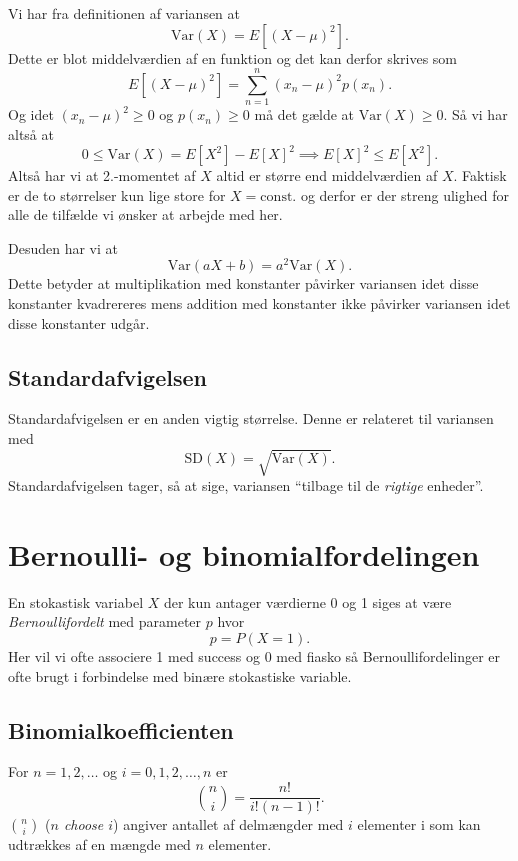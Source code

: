 Vi har fra definitionen af variansen at
\[ 
\mathrm{Var}(X) = E \left[ (X-\mu)^2 \right]
.\]
Dette er blot middelværdien af en funktion og det kan derfor skrives som
\[ 
  E \left[ (X-\mu)^2 \right] = \sum_{n = 1}^{n} (x_n - \mu)^2 p(x_n)
.\]
Og idet $(x_n - \mu)^2 \geq 0$ og $p(x_n) \geq 0$ må det gælde at $\mathrm{Var}(X) \geq 0$. Så vi har altså at
\[ 
  0 \leq \mathrm{Var}(X) = E \left[ X^2 \right] - E[X]^2 \implies E[X]^2 \leq E[X^2]
.\]
Altså har vi at 2.-momentet af $X$ altid er større end middelværdien af $X$. Faktisk er de to størrelser kun lige store for $X = \mathrm{const.}$ og derfor er der streng ulighed for alle de tilfælde vi ønsker at arbejde med her.

Desuden har vi at
\[ 
  \mathrm{Var}(aX + b) = a^2\mathrm{Var}(X)
.\]
Dette betyder at multiplikation med konstanter påvirker variansen idet disse konstanter kvadrereres mens addition med konstanter ikke påvirker variansen idet disse konstanter udgår.

\subsection{Standardafvigelsen}
Standardafvigelsen er en anden vigtig størrelse. Denne er relateret til variansen med
\[ 
  \mathrm{SD}(X) = \sqrt{\mathrm{Var}(X)}
.\]
Standardafvigelsen tager, så at sige, variansen ``tilbage til de \textit{rigtige} enheder''. 

\section{Bernoulli- og binomialfordelingen}
\begin{definition}[Bernoullifordelingen] \label{afs:forber}
  En stokastisk variabel $X$ der kun antager værdierne 0 og 1 siges at være \textit{Bernoullifordelt} med parameter $p$ hvor
  \[ 
  p = P(X=1)
  .\]
  Her vil vi ofte associere 1 med success og 0 med fiasko så Bernoullifordelinger er ofte brugt i forbindelse med binære stokastiske variable.
\end{definition}

\subsection{Binomialkoefficienten}
For $n = 1,2,\ldots $ og $i = 0,1,2,\ldots, n$ er
\[ 
  \binom{n}{i} = \frac{n!}{i!(n-1)!}
.\]
$\binom{n}{i}$ (\textit{$n$ choose $i$}) angiver antallet af delmængder med $i$ elementer i som kan udtrækkes af en mængde med $n$ elementer.


